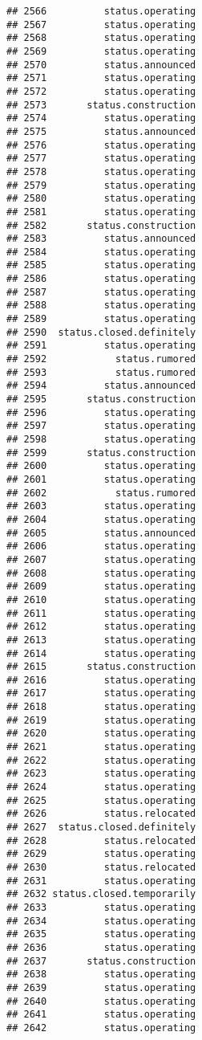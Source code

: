 \documentclass[
]{article}
\begin{document}
\begin{verbatim}
## 2566          status.operating
## 2567          status.operating
## 2568          status.operating
## 2569          status.operating
## 2570          status.announced
## 2571          status.operating
## 2572          status.operating
## 2573       status.construction
## 2574          status.operating
## 2575          status.announced
## 2576          status.operating
## 2577          status.operating
## 2578          status.operating
## 2579          status.operating
## 2580          status.operating
## 2581          status.operating
## 2582       status.construction
## 2583          status.announced
## 2584          status.operating
## 2585          status.operating
## 2586          status.operating
## 2587          status.operating
## 2588          status.operating
## 2589          status.operating
## 2590  status.closed.definitely
## 2591          status.operating
## 2592            status.rumored
## 2593            status.rumored
## 2594          status.announced
## 2595       status.construction
## 2596          status.operating
## 2597          status.operating
## 2598          status.operating
## 2599       status.construction
## 2600          status.operating
## 2601          status.operating
## 2602            status.rumored
## 2603          status.operating
## 2604          status.operating
## 2605          status.announced
## 2606          status.operating
## 2607          status.operating
## 2608          status.operating
## 2609          status.operating
## 2610          status.operating
## 2611          status.operating
## 2612          status.operating
## 2613          status.operating
## 2614          status.operating
## 2615       status.construction
## 2616          status.operating
## 2617          status.operating
## 2618          status.operating
## 2619          status.operating
## 2620          status.operating
## 2621          status.operating
## 2622          status.operating
## 2623          status.operating
## 2624          status.operating
## 2625          status.operating
## 2626          status.relocated
## 2627  status.closed.definitely
## 2628          status.relocated
## 2629          status.operating
## 2630          status.relocated
## 2631          status.operating
## 2632 status.closed.temporarily
## 2633          status.operating
## 2634          status.operating
## 2635          status.operating
## 2636          status.operating
## 2637       status.construction
## 2638          status.operating
## 2639          status.operating
## 2640          status.operating
## 2641          status.operating
## 2642          status.operating

\end{verbatim}
\end{document}

